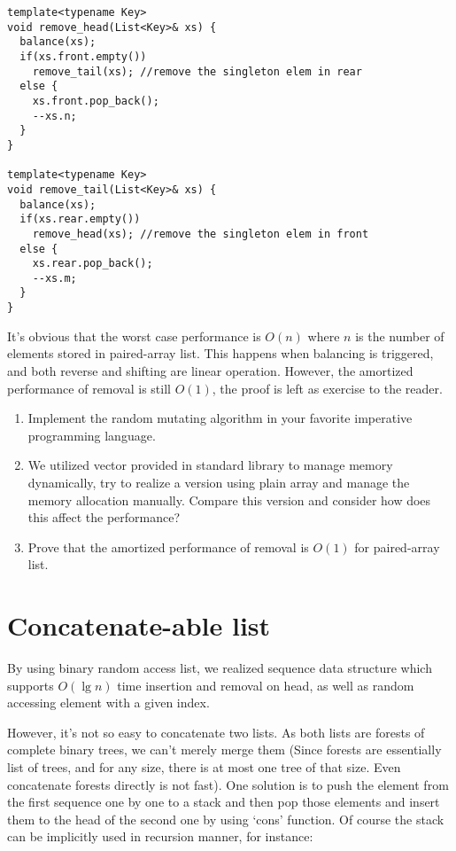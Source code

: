 \documentclass[UTF8]{article}
\begin{document}
\begin{lstlisting}
template<typename Key>
void remove_head(List<Key>& xs) {
  balance(xs);
  if(xs.front.empty())
    remove_tail(xs); //remove the singleton elem in rear
  else {
    xs.front.pop_back();
    --xs.n;
  }
}

template<typename Key>
void remove_tail(List<Key>& xs) {
  balance(xs);
  if(xs.rear.empty())
    remove_head(xs); //remove the singleton elem in front
  else {
    xs.rear.pop_back();
    --xs.m;
  }
}
\end{lstlisting}

It's obvious that the worst case performance is $O(n)$ where $n$ is the number of elements
stored in paired-array list. This happens when balancing is triggered, and both reverse
and shifting are linear operation. However, the amortized performance of removal is still
$O(1)$, the proof is left as exercise to the reader.

\begin{Exercise}
\begin{enumerate}
\item Implement the random mutating algorithm in your favorite imperative programming language.
\item We utilized vector provided in standard library to manage memory dynamically, try to realize
a version using plain array and manage the memory allocation manually. Compare this version and
consider how does this affect the performance?
\item Prove that the amortized performance of removal is $O(1)$ for paired-array list.
\end{enumerate}
\end{Exercise}

\section{Concatenate-able list}
By using binary random access list, we realized sequence data structure which
supports $O(\lg n)$ time insertion and removal on head, as well as random accessing element
with a given index.

However, it's not so easy to concatenate two lists. As both lists are forests of
complete binary trees, we can't merely merge them (Since forests are essentially
list of trees, and for any size, there is at most one tree of that size. Even
concatenate forests directly is not fast). One solution is to push the element
from the first sequence one by one to a stack and then pop those elements and insert
them to the head of the second one by using `cons' function. Of course the
stack can be implicitly used in recursion manner, for instance:
\end{document}

